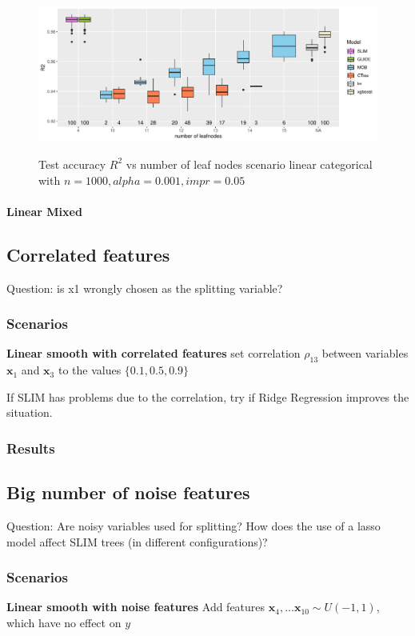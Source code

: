 \begin{figure} 
\caption{Test accuracy $R^2$ vs number of leaf nodes scenario linear categorical with $n=1000, alpha = 0.001, impr = 0.05$}
    \includegraphics[width=16cm]{Figures/simulations/batchtools/basic_scenarios/linear_abrupt/la_1000_standalone_r2_test.pdf}
    \label{fig:la_1000_standalone_r2_test}
\end{figure} 


\paragraph{Linear Mixed}


\newpage
\subsection{Correlated features}
Question: is x1 wrongly chosen as the splitting variable?
\subsubsection{Scenarios}

\textbf{Linear smooth with correlated features} set correlation $\rho_{13}$ between  variables $\textbf{x}_1$ and $\textbf{x}_3$ to the values $\{0.1, 0.5, 0.9\}$

If SLIM has problems due to the correlation, try if Ridge Regression improves the situation.

\subsubsection{Results}


\subsection{Big number of noise features}
Question: Are noisy variables used for splitting? How does the use of a lasso model affect SLIM trees (in different configurations)?
\subsubsection{Scenarios}
\textbf{Linear smooth with noise features}
Add features $\textbf{x}_{4}, ... \textbf{x}_{10} \sim U(-1,1)$, which have no effect on $y$


